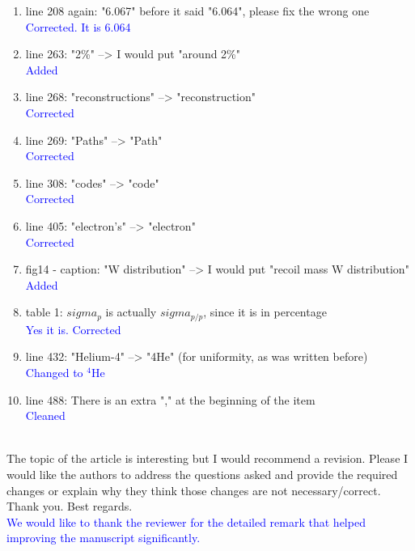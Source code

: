 \documentclass[a4paper,11pt,twoside]{article}
\begin{document}
\begin{enumerate}
\item line 208 again: "6.067" before it said "6.064", please fix the wrong one
\textcolor{blue}{Corrected. It is 6.064} \\

\item line 263: "2\%" --> I would put "around 2\%"\\
\textcolor{blue}{Added} 

\item line 268: "reconstructions" --> "reconstruction"\\
\textcolor{blue}{Corrected } 

\item line 269: "Paths" --> "Path"\\
\textcolor{blue}{Corrected} 

\item line 308: "codes" --> "code"\\
\textcolor{blue}{Corrected} 

\item line 405: "electron's" --> "electron"\\
\textcolor{blue}{Corrected} 

\item fig14 - caption: "W distribution" --> I would put "recoil mass W 
   distribution"\\
\textcolor{blue}{Added} 

\item table 1: $sigma_{p}$ is actually $sigma_{p/p}$, since it is in 
   percentage\\
\textcolor{blue}{Yes it is. Corrected } 

\item line 432: "Helium-4" --> "4He" (for uniformity, as was written before)\\
\textcolor{blue}{Changed to $^4$He} 

\item line 488: There is an extra "," at the beginning of the item\\
\textcolor{blue}{Cleaned}\\
~\\
\end{enumerate}

The topic of the article is interesting but I would recommend a revision.  
Please I would like the authors to address the questions asked and provide the 
required changes or explain why they think those changes are not 
necessary/correct. Thank you. Best regards.\\

\textcolor{blue}{We would like to thank the reviewer for the detailed remark that
helped improving the manuscript significantly.}
\end{document}

